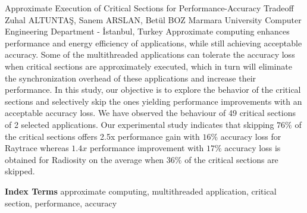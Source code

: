 
    \begin{abstract_online}{Approximate Execution of Critical Sections for Performance-Accuracy Tradeoff}{%
        Zuhal ALTUNTAŞ, Sanem ARSLAN, Betül BOZ}{%
        }{%
        Marmara University Computer Engineering Department - İstanbul, Turkey}
    Approximate computing enhances performance and energy efficiency of applications, while still achieving acceptable accuracy. Some of the multithreaded applications can tolerate the accuracy loss when critical sections are approximately executed, which in turn will eliminate the synchronization overhead of these applications and increase their performance. In this study, our objective is to explore the behavior of the critical sections and selectively skip the ones yielding performance improvements with an acceptable accuracy loss. We have observed the behaviour of 49 critical sections of 2 selected applications. Our experimental study indicates that skipping $76 \%$ of the critical sections offers 2.5x performance gain with $16 \%$ accuracy loss for Raytrace whereas $1.4 x$ performance improvement with $17 \%$ accuracy loss is obtained for Radiosity on the average when $36 \%$ of the critical sections are skipped. 
    
            \textbf{Index Terms} \newline{}approximate computing, multithreaded application, critical section, performance, accuracy
    \end{abstract_online}
    